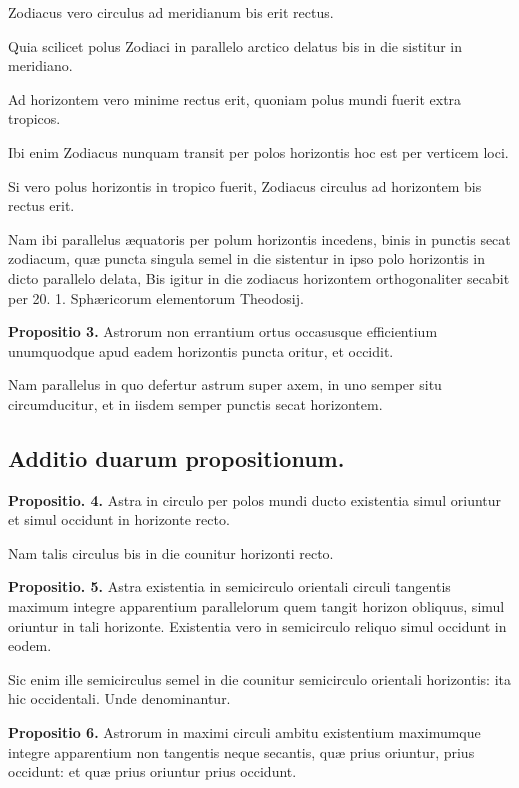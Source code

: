 \documentclass[11pt,a4paper]{article}
\begin{document}
Zodiacus vero circulus ad meridianum bis erit rectus.

Quia scilicet polus Zodiaci in parallelo arctico delatus bis in die sistitur in meridiano.

Ad horizontem vero minime rectus erit, quoniam polus mundi fuerit extra tropicos.

Ibi enim Zodiacus nunquam transit per polos horizontis hoc est per verticem loci.

Si vero polus horizontis in tropico fuerit, Zodiacus circulus ad horizontem bis rectus erit.

Nam ibi parallelus æquatoris per polum horizontis incedens, binis in punctis secat zodiacum, quæ puncta singula semel in die sistentur in ipso polo horizontis in dicto parallelo delata, Bis igitur in die zodiacus horizontem orthogonaliter secabit per 20. 1. Sphæricorum elementorum Theodosij.

\textbf{Propositio 3.} Astrorum non errantium ortus occasusque efficientium unumquodque apud eadem horizontis puncta oritur, et occidit.

Nam parallelus in quo defertur astrum super axem, in uno semper situ circumducitur, et in iisdem semper punctis secat horizontem.

\subsection*{Additio duarum propositionum.}

\textbf{Propositio. 4.} Astra in circulo per polos mundi ducto existentia simul oriuntur et simul occidunt in horizonte recto.

Nam talis circulus bis in die counitur horizonti recto.

\textbf{Propositio. 5.} Astra existentia in semicirculo orientali circuli tangentis maximum integre apparentium parallelorum quem tangit horizon obliquus, simul oriuntur in tali horizonte. Existentia vero in semicirculo reliquo simul occidunt in eodem.

Sic enim ille semicirculus semel in die counitur semicirculo orientali horizontis: ita hic occidentali. Unde denominantur.

\textbf{Propositio 6.} Astrorum in maximi circuli ambitu existentium maximumque integre apparentium non tangentis neque secantis, quæ prius oriuntur, prius occidunt: et quæ prius oriuntur prius occidunt.
\end{document}
